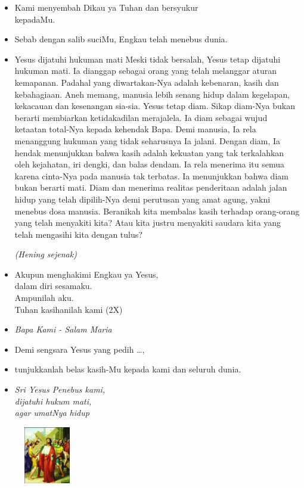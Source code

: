 \documentclass[a5paper,headsepline,titlepage,11pt,nnormalheadings,DIVcalc]{scrbook}
\newcommand{\BU}[1]{\begin{itemize} \item[U:] #1 \end{itemize}}
\newcommand{\BP}[1]{\begin{itemize} \item[P:] #1 \end{itemize}}
\newcommand{\kamiMenyembah}{\BP{ Kami menyembah Dikau ya Tuhan dan bersyukur\\kepadaMu.}
\BU{ Sebab dengan salib suciMu, Engkau telah menebus dunia.}
}
\newcommand{\kasihanilahKami}{\BP{Demi sengsara Yesus yang pedih \ldots,}
\BU{tunjukkanlah belas kasih-Mu kepada kami dan seluruh dunia.}}
\def\hening{\par \textit{(Hening sejenak)}}
\begin{document}
\kamiMenyembah
\BP{Yesus dijatuhi hukuman mati
Meski tidak bersalah, Yesus tetap dijatuhi hukuman mati. Ia dianggap sebagai orang yang telah melanggar aturan kemapanan. Padahal yang diwartakan-Nya adalah kebenaran, kasih dan kebahagiaan. Aneh memang, manusia lebih senang hidup dalam kegelapan, kekacauan dan kesenangan sia-sia. Yesus tetap diam.  Sikap diam-Nya bukan berarti membiarkan ketidakadilan merajalela. Ia diam sebagai wujud ketaatan total-Nya kepada kehendak Bapa. Demi manusia, Ia rela menanggung hukuman yang tidak seharusnya Ia jalani. Dengan diam, Ia hendak menunjukkan bahwa kasih adalah kekuatan yang tak terkalahkan oleh kejahatan, iri dengki, dan balas dendam. Ia rela menerima itu semua karena cinta-Nya pada manusia tak terbatas. Ia menunjukkan bahwa diam bukan berarti mati. Diam dan menerima realitas penderitaan adalah jalan hidup yang telah dipilih-Nya demi perutusan yang amat agung, yakni menebus dosa manusia. Beranikah kita membalas kasih terhadap orang-orang yang telah menyakiti kita? Atau kita justru menyakiti saudara kita yang telah mengasihi kita dengan tulus?
\hening
}

\BU{Akupun menghakimi Engkau ya Yesus,\\ dalam diri sesamaku.\\ Ampunilah aku.\\
Tuhan kasihanilah kami (2X)}
 
\large\begin{itemize}\item[~]\it{Bapa Kami - Salam Maria}\end{itemize}\normalsize

\kasihanilahKami

\begin{itemize}
\item[2.] \it{Sri Yesus Penebus kami,\\ 
	dijatuhi hukum mati,\\ 
	agar umatNya hidup}
\end{itemize}



\begin{figure}
\includegraphics[width=2cm]{jalansalib_files/02_small.jpg}
\end{figure}
\end{document}
